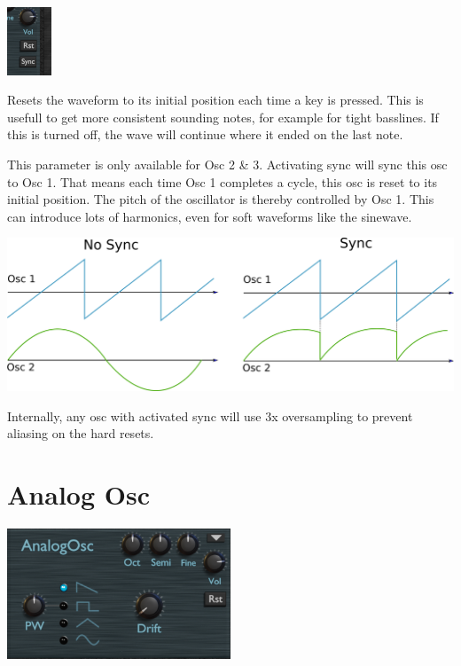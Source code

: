 \begin{center}
    \includegraphics[width=0.1\textwidth]{graphics/osc_common2.png}
\end{center}

Resets the waveform to its initial position each time a key is pressed. This is usefull to get more consistent sounding notes, for example for tight basslines. If this is turned off, the wave will continue where it ended on the last note.

This parameter is only available for Osc 2 \& 3. Activating sync will sync this osc to Osc 1. That means each time Osc 1 completes a cycle, this osc is reset to its initial position. The pitch of the oscillator is thereby controlled by Osc 1. This can introduce lots of harmonics, even for soft waveforms like the sinewave.

\vspace{5mm}

\includegraphics[width=\textwidth]{graphics/osc_sync.png}

Internally, any osc with activated sync will use 3x oversampling to prevent aliasing on the hard resets.

\section{Analog Osc}

\begin{center}
    \includegraphics[width=0.5\textwidth]{graphics/analog_osc.png}
\end{center}

